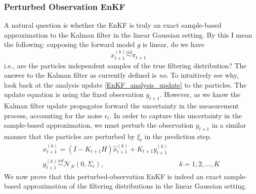 \documentclass[12pt]{article}
\begin{document}
\subsubsection{Perturbed Observation EnKF}
A natural question is whether the EnKF is truly an exact sample-based approximation to the Kalman filter in the linear Gaussian setting. By this I mean the following: 
supposing the forward model $g$ is linear, do we have 
\[x^{(k)}_{t+1} \overset{iid}{\sim} \pi_{t+1} \]
i.e., are the particles independent samples of the true filtering distribution? The answer to the Kalman filter as currently defined is \textit{no}. To intuitively see why,  
look back at the analysis update \ref{EnKF_analysis_update} to the particles. The update equation is using the fixed observation $y_{t+1}$. However, as we know 
the Kalman filter update propagates forward the uncertainty in the measurement process, accounting for the noise $\epsilon_t$. In order to capture this uncertainty 
in the sample-based approximation, we must perturb the observation $y_{t+1}$ in a similar manner that the particles are perturbed by $\xi_t$ in the prediction step. 
\begin{align}
&x^{(k)}_{t+1} = (I - K_{t+1}H) \hat{x}^{(k)}_{t+1} + K_{t+1} y^{(k)}_{t+1} \label{EnKF_analysis_update_perturbed_obs} \\
&y^{(k)}_{t+1} \overset{iid}{\sim} \mathcal{N}_N(0, \Sigma_{\epsilon}), && k = 1, 2, \dots, K \nonumber 
\end{align}
We now prove that this perturbed-observation EnKF is indeed an exact sample-based approximation of the filtering distributions in the linear Gaussian setting. 
\end{document}
